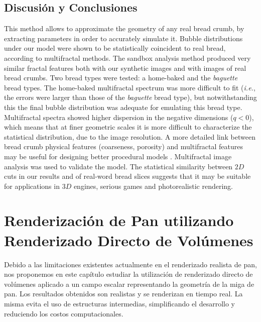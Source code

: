 \documentclass[spanish,a4paper,11pt,oneside,links]{report}
\begin{document}

\section{Discusi\'on y Conclusiones}
This method allows to approximate the geometry of any real bread crumb, by 
extracting parameters in order to accurately simulate it.
Bubble distributions under our model were shown to be statistically coincident to real bread, according to multifractal methods.
The sandbox analysis method produced very similar fractal features both with our synthetic images and with images of real bread crumbs.
Two bread types were tested: a home-baked and the {\em baguette } bread types.
The home-baked multifractal spectrum was more difficult to fit ({\em i.e.}, the errors were larger than those of the {\em baguette} bread type), but notwithstanding this the final bubble distribution was adequate for emulating this bread type.
Multifractal spectra showed higher dispersion in the negative dimensions ($q < 0$), which means that at finer geometric scales it is more difficult to characterize the statistical distribution, due to the image resolution.
A more detailed link between bread crumb physical features (coarseness, porosity) and multifractal features may be useful for designing better procedural models \cite{Baravalle2012}.
Multifractal image analysis was used to validate the model.
The statistical similarity between $2D$ cuts in our results and of real-word bread slices suggests that it may be suitable for applications in $3D$ engines, serious games \cite{Susi2007} and photorealistic rendering. 



\chapter{Renderización de Pan utilizando Renderizado Directo de Volúmenes}
Debido a las limitaciones existentes actualmente en el renderizado realista de pan, nos proponemos en este capítulo estudiar la utilización de renderizado directo de volúmenes aplicado a un campo escalar representando la geometría de la miga de pan. Los resultados obtenidos son realistas y se renderizan en tiempo real. La misma evita el uso de estructuras intermedias, simplificando el desarrollo y reduciendo los costos computacionales.
\end{document}
